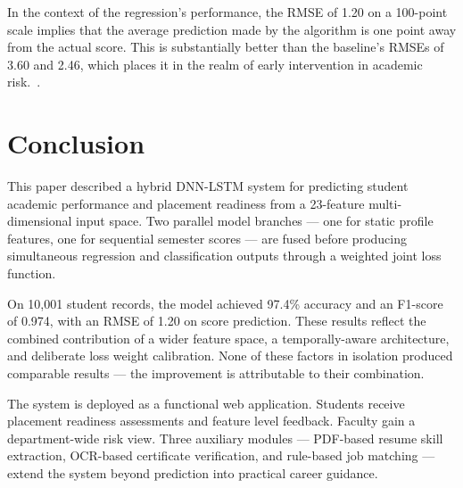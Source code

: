 \documentclass[conference]{IEEEtran}
\begin{document}
In the context of the regression's performance, the RMSE of 1.20 on a 100-point scale implies that the average prediction made by the algorithm is one point away from the actual score. This is substantially better than the baseline's RMSEs of 3.60 and 2.46, which places it in the realm of early intervention in academic risk.~\cite{R7}.

\section{Conclusion}
\label{sec:conclusion}

This paper described a hybrid DNN-LSTM system for predicting student academic performance and placement readiness
from a 23-feature multi-dimensional input space. Two parallel
model branches — one for static profile features, one for
sequential semester scores — are fused before producing
simultaneous regression and classification outputs through a
weighted joint loss function.

On 10,001 student records, the model achieved 97.4\% accuracy and an F1-score of 0.974, with an RMSE of 1.20 on score
prediction. These results reflect the combined contribution of
a wider feature space, a temporally-aware architecture, and
deliberate loss weight calibration. None of these factors in
isolation produced comparable results — the improvement is
attributable to their combination.

The system is deployed as a functional web application.
Students receive placement readiness assessments and feature level feedback. Faculty gain a department-wide risk view.
Three auxiliary modules — PDF-based resume skill extraction, OCR-based certificate verification, and rule-based job
matching — extend the system beyond prediction into practical
career guidance.
\end{document}
